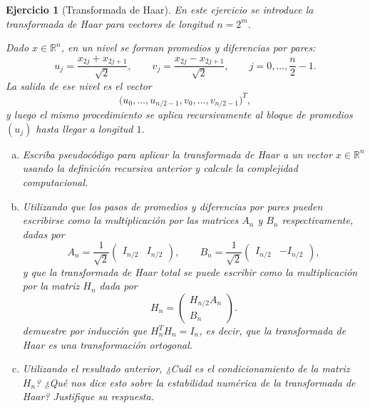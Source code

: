 \documentclass[12pt]{article}
\newtheorem{exercise}{Ejercicio}
\begin{document}
\begin{exercise}[Transformada de Haar]
En este ejercicio se introduce la transformada de Haar para vectores de longitud $n=2^m$.

Dado $x\in\mathbb{R}^n$, en un nivel se forman promedios y diferencias por pares:
\[
u_j=\frac{x_{2j}+x_{2j+1}}{\sqrt2},
\qquad
v_j=\frac{x_{2j}-x_{2j+1}}{\sqrt2},
\qquad j=0,\ldots,\frac n2-1.
\]
La salida de ese nivel es el vector
\[
\bigl(u_0,\ldots,u_{n/2-1},v_0,\ldots,v_{n/2-1}\bigr)^T,
\]
y luego el mismo procedimiento se aplica recursivamente al bloque de promedios $(u_j)$ hasta llegar a longitud $1$.

\begin{enumerate}[(a)]
\item Escriba pseudocódigo para aplicar la transformada de Haar a un vector $x\in\mathbb{R}^n$ usando la definición recursiva anterior y calcule la complejidad computacional.

\item Utilizando que los pasos de promedios y diferencias por pares pueden escribirse como la multiplicación por las matrices $A_n$ y $B_n$ respectivamente, dadas por
\[
A_n=\frac1{\sqrt2}\begin{pmatrix}I_{n/2} & I_{n/2}\end{pmatrix},
\qquad
B_n=\frac1{\sqrt2}\begin{pmatrix}I_{n/2} & -I_{n/2}\end{pmatrix},
\]
y que la transformada de Haar total se puede escribir como la multiplicación por la matriz $H_n$ dada por
\[    
H_n=\begin{pmatrix}
H_{n/2}A_n\\
B_n
\end{pmatrix}.
\]
demuestre por inducción que $H_n^TH_n=I_n$, es decir, que la transformada de Haar es una transformación ortogonal.
\item Utilizando el resultado anterior, ¿Cuál es el condicionamiento de la matriz $H_n$? ¿Qué nos dice esto sobre la estabilidad numérica de la transformada de Haar? Justifique su respuesta.
\end{enumerate}
\end{exercise}
\end{document}
